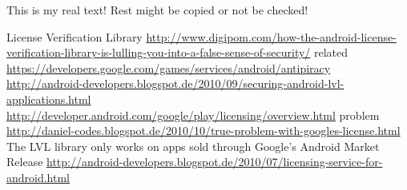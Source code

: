 This is my real text! Rest might be copied or not be checked!

License Verification Library\newline
\url{http://www.digipom.com/how-the-android-license-verification-library-is-lulling-you-into-a-false-sense-of-security/}\newline
related \url{https://developers.google.com/games/services/android/antipiracy}\newline
\url{http://android-developers.blogspot.de/2010/09/securing-android-lvl-applications.html}\newline
\url{http://developer.android.com/google/play/licensing/overview.html}\newline
problem \url{http://daniel-codes.blogspot.de/2010/10/true-problem-with-googles-license.html}\newline
The LVL library only works on apps sold through Google's Android Market
Release \url{http://android-developers.blogspot.de/2010/07/licensing-service-for-android.html}
